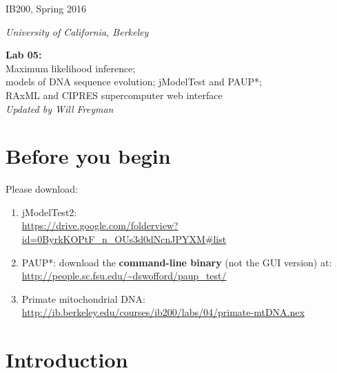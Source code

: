 \documentclass[11pt]{article}
\begin{document}
\noindent
\large
\begin{minipage}{0.5\textwidth}
\begin{flushleft} 
IB200, Spring 2016
\end{flushleft}
\end{minipage}
\begin{minipage}{0.5\textwidth}
\begin{flushright} 
\textit{University of California, Berkeley}
\end{flushright}
\end{minipage}

\vspace{0.5cm}


\begin{center}
\Large \textbf{Lab 05:} \\
Maximum likelihood inference; \\ 
models of DNA sequence evolution; jModelTest and PAUP*; \\ 
RAxML and CIPRES supercomputer web interface \\
\normalsize
\textit{Updated by Will Freyman}
\end{center}

\vspace{0.5cm}

\section{Before you begin}

Please download:

\begin{enumerate}
  \item jModelTest2: \\ 
        \url{https://drive.google.com/folderview?id=0ByrkKOPtF_n_OUs3d0dNcnJPYXM#list}
  \item PAUP*: download the \textbf{command-line binary} (not the GUI version) at: \\ 
        \url{http://people.sc.fsu.edu/~dswofford/paup_test/}
  \item Primate mitochondrial DNA: \\
        \url{http://ib.berkeley.edu/courses/ib200/labs/04/primate-mtDNA.nex}
\end{enumerate}


\section{Introduction}
\end{document}
